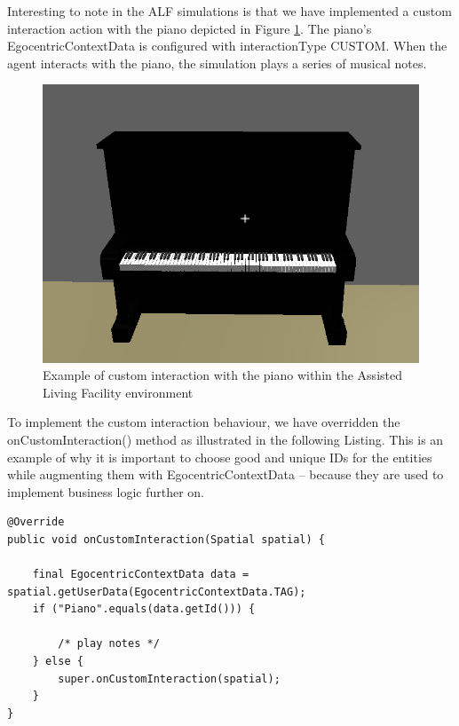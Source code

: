 Interesting to note in the ALF simulations is that we have implemented a custom interaction action with the piano depicted in Figure \ref{fig:impl_piano}. The piano's EgocentricContextData is configured with interactionType CUSTOM. When the agent interacts with the piano, the simulation plays a series of musical notes.
\begin{figure}[H]
	\centering
	\includegraphics[width=0.8\linewidth]{gfx/Chapter4/piano}
	\caption{Example of custom interaction with the piano within the Assisted Living Facility environment}
	\label{fig:impl_piano}
\end{figure}

To implement the custom interaction behaviour, we have overridden the onCustomInteraction() method as illustrated in the following Listing. This is an example of why it is important to choose good and unique IDs for the entities while augmenting them with EgocentricContextData -- because they are used to implement business logic further on.
\begin{lstlisting}[caption={Snippet of code illustrating how to implement a CUSTOM interaction with an object},label={lst:custom_interaction}]
@Override
public void onCustomInteraction(Spatial spatial) {
    
    final EgocentricContextData data = spatial.getUserData(EgocentricContextData.TAG);
    if ("Piano".equals(data.getId())) {
        
        /* play notes */
    } else {
        super.onCustomInteraction(spatial);
    }
}
\end{lstlisting}

